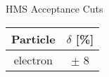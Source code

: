 \begin{Mtable}{HMS Acceptance Cuts}
  \centering
  \begin{tabular}{|c|c|}
    \hline
    \textbf{Particle} & \textbf{$\delta$ [\%]} \\
    \hline    
    electron & $\pm$ 8 \\
    \hline
  \end{tabular}
  \caption{}
  \label{tab:3-3_hms_accep_cuts}
\end{Mtable}

